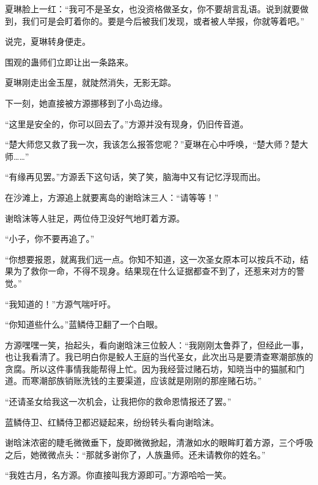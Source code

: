 \begin{this_body}
夏琳脸上一红：“我可不是圣女，也没资格做圣女，你不要胡言乱语。说到就要做到，我们可是会盯着你的。要是今后被我们发现，或者被人举报，你就等着吧。”

说完，夏琳转身便走。

围观的蛊师们立即让出一条路来。

夏琳刚走出金玉屋，就陡然消失，无影无踪。

下一刻，她直接被方源挪移到了小岛边缘。

“这里是安全的，你可以回去了。”方源并没有现身，仍旧传音道。

“楚大师您又救了我一次，我该怎么报答您呢？”夏琳在心中呼唤，“楚大师？楚大师……”

“有缘再见罢。”方源丢下这句话，笑了笑，脑海中又有记忆浮现而出。

在沙滩上，方源追上就要离岛的谢晗沫三人：“请等等！”

谢晗沫等人驻足，两位侍卫没好气地盯着方源。

“小子，你不要再追了。”

“你想要报恩，就离我们远一点。你知不知道，这一次圣女原本可以按兵不动，结果为了救你一命，不得不现身。结果现在什么证据都查不到了，还惹来对方的警觉。”

“我知道的！”方源气喘吁吁。

“你知道些什么。”蓝鳞侍卫翻了一个白眼。

方源嘿嘿一笑，抬起头，看向谢晗沫三位鲛人：“我刚刚太鲁莽了，但经此一事，也让我看清了。我已明白你是鲛人王庭的当代圣女，此次出马是要清查寒潮部族的贪腐。所以这件事情我能帮得上忙。因为我经营过赌石坊，知晓当中的猫腻和门道。而寒潮部族销账洗钱的主要渠道，应该就是刚刚的那座赌石坊。”

“还请圣女给我这一次机会，让我把你的救命恩情报还了罢。”

蓝鳞侍卫、红鳞侍卫都迟疑起来，纷纷转头看向谢晗沫。

谢晗沫浓密的睫毛微微垂下，旋即微微掀起，清澈如水的眼眸盯着方源，三个呼吸之后，她微微点头：“那就多谢你了，人族蛊师。还未请教你的姓名。”

“我姓古月，名方源。你直接叫我方源即可。”方源哈哈一笑。

\end{this_body}

